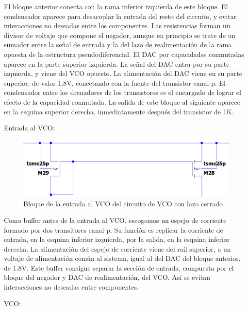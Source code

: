 \documentclass[12pt]{report} %
\begin{document}
	El bloque anterior conecta con la rama inferior izquierda de este bloque. El condensador aparece para desacoplar la entrada del resto del circuito, y evitar interacciones no deseadas entre los componentes. Las resistencias forman un divisor de voltaje que compone el negador, aunque en principio se trate de un sumador entre la señal de entrada y la del lazo de realimentación de la rama opuesta de la estructura pseudodiferencial. El DAC por capacidades conmutadas aparece en la parte superior izquierda. La señal del DAC entra por su parte izquierda, y viene del VCO opuesto. La alimentación del DAC viene en su parte superior, de valor 1.8V, conectando con la fuente del transistor canal-p. El condensador entre los drenadores de los transistores es el encargado de lograr el efecto de la capacidad conmutada. La salida de este bloque al siguiente aparece en la esquina superior derecha, inmediatamente después del transistor de 1K.
	
	Entrada al VCO:
	
	\begin{figure}[H]
		\includegraphics[width=\textwidth]{ltspice-vco-closed-current-mirror-block.png}
		\caption[Bloque de la entrada al VCO del circuito de VCO con lazo cerrado]{Bloque de la entrada al VCO del circuito de VCO con lazo cerrado}
		\label{fig:ltspice-vco-closed-current-mirror-block.png}
	\end{figure}

	Como buffer antes de la entrada al VCO, escogemos un espejo de corriente formado por dos transitores canal-p. Su función es replicar la corriente de entrada, en la esquina inferior izquierda, por la salida, en la esquina inferior derecha. La alimentación del espejo de corriente viene del rail superior, a un voltaje de alimentación común al sistema, igual al del DAC del bloque anterior, de 1.8V. Este buffer consigue separar la sección de entrada, compuesta por el bloque del negador y DAC de realimentación, del VCO. Así se evitan interacciones no deseadas entre componentes.

	VCO:
		
\end{document}
